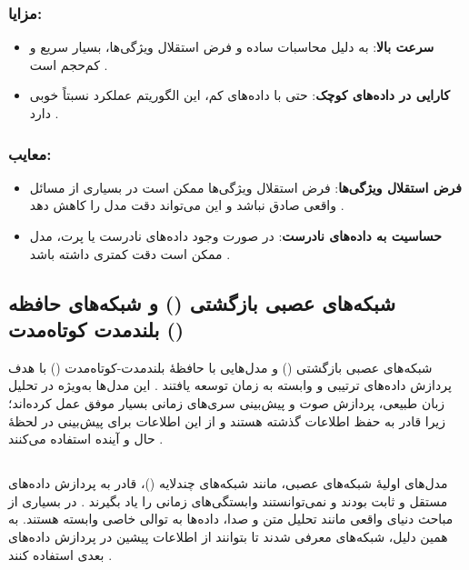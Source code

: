 \subsubsection{مزایا:}
\begin{itemize}
	\item \textbf{سرعت بالا}: به دلیل محاسبات ساده و فرض استقلال ویژگی‌ها،  بسیار سریع و کم‌حجم است
	\cite{mccallum1998comparison}.
	\item \textbf{کارایی در داده‌های کوچک}: حتی با داده‌های کم، این الگوریتم عملکرد نسبتاً خوبی دارد
	\cite{murphy2012machine}.
\end{itemize}

\subsubsection{معایب:}
\begin{itemize}
	\item \textbf{فرض استقلال ویژگی‌ها}: فرض استقلال ویژگی‌ها ممکن است در بسیاری از مسائل واقعی صادق نباشد و این می‌تواند دقت مدل را کاهش دهد
	\cite{domingos1997optimal}.
	\item \textbf{حساسیت به داده‌های نادرست}: در صورت وجود داده‌های نادرست یا پرت، مدل ممکن است دقت کمتری داشته باشد
	\cite{bishop2006pattern}.
\end{itemize}


\subsection{شبکه‌های عصبی بازگشتی () و شبکه‌های حافظه بلندمدت کوتاه‌مدت ()}
شبکه‌های عصبی بازگشتی () و مدل‌هایی با حافظهٔ بلندمدت-کوتاه‌مدت ()
با هدف پردازش داده‌های ترتیبی و وابسته به زمان توسعه یافتند
\cite{rumelhart1986learning,hochreiter1997long}.
این مدل‌ها به‌ویژه در تحلیل زبان طبیعی، پردازش صوت و پیش‌بینی سری‌های زمانی بسیار موفق عمل کرده‌اند؛ زیرا قادر به حفظ اطلاعات گذشته هستند و از این اطلاعات برای پیش‌بینی در لحظهٔ حال و آینده استفاده می‌کنند
\cite{gers1999learning}.

\subsection{}
مدل‌های اولیهٔ شبکه‌های عصبی، مانند شبکه‌های چندلایه ()، قادر به پردازش داده‌های مستقل و ثابت بودند و نمی‌توانستند وابستگی‌های زمانی را یاد بگیرند
\cite{bishop2006pattern}.
در بسیاری از مباحث دنیای واقعی مانند تحلیل متن و صدا، داده‌ها به توالی خاصی وابسته هستند. به همین دلیل، شبکه‌های  معرفی شدند تا بتوانند از اطلاعات پیشین در پردازش داده‌های بعدی استفاده کنند
\cite{rumelhart1986learning}.



